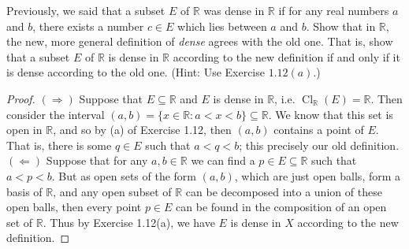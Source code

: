 \documentclass[10pt,reqno]{amsart}
\theoremstyle{definition}
\newcommand{\rr}{\mathbb R}
\DeclareMathOperator{\Cl}{Cl}
\begin{document}
\begin{tcolorbox}[colback=black!5!white,colframe=black!75!black,title= Chapter 4: Exercise $1.13.$] Previously, we said that a subset $E$ of $\rr$ was dense in $\rr$ if for any real numbers $a$ and $b$, there exists a number $c \in E$ which lies between $a$ and $b$. Show that in $\rr$, the new, more general definition of \textit{dense} agrees with the old one. That is, show that a subset $E$ of $\rr$ is dense in $\rr$ according to the new definition if and only if it is dense according to the old one. (Hint: Use Exercise $1.12(a)$.)
\tcblower 
\begin{proof} $(\Rightarrow)$ Suppose that $E \subseteq \rr$ and $E$ is dense in $\rr$, i.e. $\Cl_\rr (E) = \rr$. Then consider the interval $(a,b) = \{x \in \rr \colon a <x < b \} \subseteq \rr$. We know that this set is open in $\rr$, and so by (a) of Exercise 1.12, then $(a,b)$ contains a point of $E$. That is, there is some $q \in E$ such that $a<q<b$; this precisely our old definition. $(\Leftarrow)$ Suppose that for any $a,b \in \rr$ we can find a $p \in E \subseteq \rr$ such that $a<p<b$. But as open sets of the form $(a,b)$, which are just open balls, form a basis of $\rr$, and any open subset of $\rr$ can be decomposed into a union of these open balls, then every point $p \in E$ can be found in the composition of an open set of $\rr$. Thus by Exercise 1.12(a), we have $E$ is dense in $X$ according to the new definition. 
\end{proof}

\end{tcolorbox}
\end{document}
